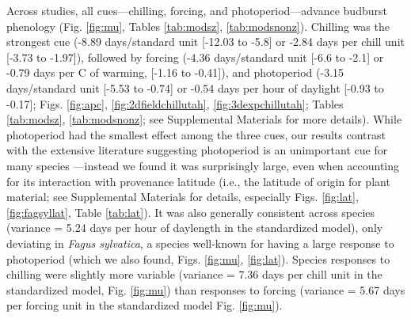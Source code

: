 \documentclass{article}
\begin{document}
\par Across studies, all cues---chilling, forcing, and photoperiod---advance budburst phenology (Fig. \ref{fig:mu}, Tables \ref{tab:modsz}, \ref{tab:modsnonz}). Chilling was the strongest cue (-8.89 days/standard unit [-12.03 to -5.8] or -2.84 days per chill unit [-3.73 to -1.97]), followed by forcing (-4.36 days/standard unit [-6.6 to -2.1] or -0.79 days per \degree C of warming, [-1.16 to -0.41]), and photoperiod (-3.15 days/standard unit [-5.53 to -0.74] or -0.54 days per hour of daylight [-0.93 to  -0.17]; Figs. \ref{fig:apc}, \ref{fig:2dfieldchillutah}, \ref{fig:3dexpchillutah}; Tables \ref{tab:modsz}, \ref{tab:modsnonz}; see Supplemental Materials for more details). While photoperiod had the smallest effect among the three cues, our results contrast with the extensive literature suggesting photoperiod is an unimportant cue for many species \emph{\citep{zohner2016,fu2019}}---instead we found it was surprisingly large, even when accounting for its interaction with provenance latitude (i.e., the latitude of origin for plant material; see Supplemental Materials for details, especially Figs. \ref{fig:lat}, \ref{fig:fagsyllat}, Table \ref{tab:lat}). It was also generally consistent across species (variance = 5.24 days per hour of daylength in the standardized model), only deviating in \emph{Fagus sylvatica}, a species well-known for having a large response to photoperiod (which we also found, Figs. \ref{fig:mu}, \ref{fig:lat}). Species responses to chilling were slightly more variable (variance = 7.36 days per chill unit in the standardized model, Fig. \ref{fig:mu}) than responses to forcing (variance = 5.67 days per forcing unit in the standardized model Fig. \ref{fig:mu}). 
\end{document}
